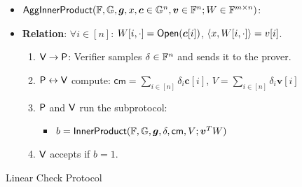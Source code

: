 \begin{figure}[h!]
\begin{framed}
\begin{itemize}
\item $\mathsf{AggInnerProduct}(\mathbb{F},\mathbb{G},\bm{g},x,\bm{c}\in \mathbb{G}^n,\bm{v}\in \mathbb{F}^n;W\in
\mathbb{F}^{m\times n})$:
\item {\bf Relation}: $\forall i\in [n]$: $W[i,\cdot]=\mathsf{Open}(\bm{c}[i])$,
$\langle x,W[i,\cdot]\rangle=v[i]$. 
\begin{enumerate}
\item $\mathsf{V}\rightarrow\mathsf{P}$: Verifier samples $\delta\in \mathbb{F}^n$ and
sends it to the prover.
\item $\mathsf{P}\leftrightarrow\mathsf{V}$ compute: $\mathsf{cm}=\sum_{i\in
[n]}\delta_i\bm{c}[i]$, $V=\sum_{i\in [n]}\delta_i\bm{v}[i]$
\item $\mathsf{P}$ and $\mathsf{V}$ run the subprotocol:
	\begin{itemize}
	\item $b=\mathsf{InnerProduct}(\mathbb{F},\mathbb{G},\bm{g},\delta,\mathsf{cm},V;\bm{v}^TW)$
	\end{itemize}
\item $\mathsf{V}$ accepts if $b=1$.
\end{enumerate}
\end{itemize}
\end{framed}
\caption{Linear Check Protocol}
\label{fig:linearcheck}
\end{figure}


